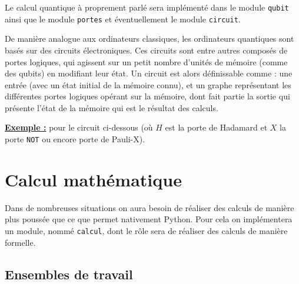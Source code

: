 \documentclass[french]{article}
\newcommand{\p}{\texttt} %
\begin{document}
Le calcul quantique à proprement parlé sera implémenté dans le module \p{qubit} ainsi que le module \p{portes} et éventuellement le module \p{circuit}.

De manière analogue aux ordinateurs classiques, les ordinateurs quantiques sont basés sur des circuits électroniques. Ces circuits sont entre autres composés de portes logiques, qui agissent sur un petit nombre d'unités de mémoire (comme des qubits) en modifiant leur état. Un circuit est alors définissable comme : une entrée (avec un état initial de la mémoire connu), et un graphe représentant les différentes portes logiques opérant sur la mémoire, dont fait partie la sortie qui présente l'état de la mémoire qui est le résultat des calculs.

\noindent \textbf{\underline{Exemple :}} pour le circuit ci-dessous (où $H$ est la porte de Hadamard et $X$ la porte \p{NOT} ou encore porte de Pauli-X).



\section{Calcul mathématique}


Dans de nombreuses situations on aura besoin de réaliser des calculs de manière plus poussée que ce que permet nativement Python. Pour cela on implémentera un module, nommé \p{calcul}, dont le rôle sera de réaliser des calculs de manière formelle.

\subsection{Ensembles de travail} \label{ensembles}
\end{document}
